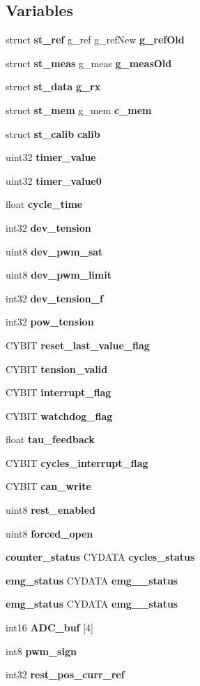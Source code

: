 \subsection*{Variables}
\begin{DoxyCompactItemize}
\item 
struct \textbf{ st\+\_\+ref} g\+\_\+ref g\+\_\+ref\+New \textbf{ g\+\_\+ref\+Old}
\item 
struct \textbf{ st\+\_\+meas} g\+\_\+meas \textbf{ g\+\_\+meas\+Old}
\item 
struct \textbf{ st\+\_\+data} \textbf{ g\+\_\+rx}
\item 
struct \textbf{ st\+\_\+mem} g\+\_\+mem \textbf{ c\+\_\+mem}
\item 
struct \textbf{ st\+\_\+calib} \textbf{ calib}
\item 
uint32 \textbf{ timer\+\_\+value}
\item 
uint32 \textbf{ timer\+\_\+value0}
\item 
float \textbf{ cycle\+\_\+time}
\item 
int32 \textbf{ dev\+\_\+tension}
\item 
uint8 \textbf{ dev\+\_\+pwm\+\_\+sat}
\item 
uint8 \textbf{ dev\+\_\+pwm\+\_\+limit}
\item 
int32 \textbf{ dev\+\_\+tension\+\_\+f}
\item 
int32 \textbf{ pow\+\_\+tension}
\item 
C\+Y\+B\+IT \textbf{ reset\+\_\+last\+\_\+value\+\_\+flag}
\item 
C\+Y\+B\+IT \textbf{ tension\+\_\+valid}
\item 
C\+Y\+B\+IT \textbf{ interrupt\+\_\+flag}
\item 
C\+Y\+B\+IT \textbf{ watchdog\+\_\+flag}
\item 
float \textbf{ tau\+\_\+feedback}
\item 
C\+Y\+B\+IT \textbf{ cycles\+\_\+interrupt\+\_\+flag}
\item 
C\+Y\+B\+IT \textbf{ can\+\_\+write}
\item 
uint8 \textbf{ rest\+\_\+enabled}
\item 
uint8 \textbf{ forced\+\_\+open}
\item 
\textbf{ counter\+\_\+status} C\+Y\+D\+A\+TA \textbf{ cycles\+\_\+status}
\item 
\textbf{ emg\+\_\+status} C\+Y\+D\+A\+TA \textbf{ emg\+\_\+\_\+status}
\item 
\textbf{ emg\+\_\+status} C\+Y\+D\+A\+TA \textbf{ emg\+\_\+\_\+status}
\item 
\mbox{\label{globals_8h_abb22f0a4462a0b4db27496654f2175a0}} 
int16 {\bfseries A\+D\+C\+\_\+buf} [4]
\item 
int8 \textbf{ pwm\+\_\+sign}
\item 
int32 \textbf{ rest\+\_\+pos\+\_\+curr\+\_\+ref}
\end{DoxyCompactItemize}


